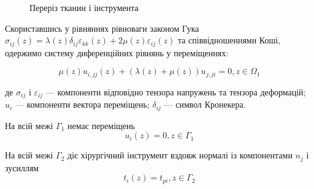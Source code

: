 \begin{figure}[ht!]
    \centering
    
    \caption{Переріз тканин і інструмента}
    \label{fig:elasticity_2d_domain}
\end{figure}

Скориставшись у рівняннях рівноваги законом Гука 
$\sigma_{ij}(z) = \lambda(z)\delta_{ij}\varepsilon_{kk}(z) + 2\mu(z)\varepsilon_{ij}(z)$ та співвідношеннями Коші, 
одержимо систему диференційних рівнянь у переміщеннях:

\begin{equation}
    \label{eqn:elasticity_2d_eqn}
    \mu(z)u_{i,jj}(z) + (\lambda(z) + \mu(z))u_{j,ji} = 0, z \in \Omega_1
\end{equation}

\noindent де $\sigma_{ij}$ і $\varepsilon_{ij}$ --- компоненти відповідно тензора напружень та тензора деформацій; $u_i$
--- компоненти вектора переміщень; $\delta_{ij}$ --- символ Кронекера.

\noindent На всій межі $\Gamma_1$ немає переміщень
\begin{equation}
    \label{eqn:elasticity_2d_cond_1}
    u_i(z) = 0, z \in \Gamma_1
\end{equation}

\noindent На всій межі $\Gamma_2$ діє хірургічний інструмент вздовж нормалі із компонентами $n_j$ і зусиллям
\begin{equation}
    \label{eqn:elasticity_2d_cond_2}
    t_i(z) = t_{pi}, z \in \Gamma_2
\end{equation}

